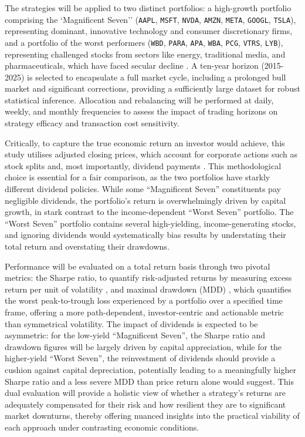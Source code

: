 \documentclass[12pt,a4paper]{report}
\begin{document}
The strategies will be applied to two distinct portfolios: a high-growth portfolio comprising the `Magnificent Seven'' (\texttt{AAPL}, \texttt{MSFT}, \texttt{NVDA}, \texttt{AMZN}, \texttt{META}, \texttt{GOOGL}, \texttt{TSLA}), representing dominant, innovative technology and consumer discretionary firms, and a portfolio of the worst performers (\texttt{WBD}, \texttt{PARA}, \texttt{APA}, \texttt{WBA}, \texttt{PCG}, \texttt{VTRS}, \texttt{LYB}), representing challenged stocks from sectors like energy, traditional media, and pharmaceuticals, which have faced secular decline \citep{YahooFinance2025}. A ten-year horizon (2015-2025) is selected to encapsulate a full market cycle, including a prolonged bull market and significant corrections, providing a sufficiently large dataset for robust statistical inference. Allocation and rebalancing will be performed at daily, weekly, and monthly frequencies to assess the impact of trading horizons on strategy efficacy and transaction cost sensitivity.

Critically, to capture the true economic return an investor would achieve, this study utilises adjusted closing prices, which account for corporate actions such as stock splits and, most importantly, dividend payments \citep{Bodie2023}. This methodological choice is essential for a fair comparison, as the two portfolios have starkly different dividend policies. While some ``Magnificent Seven'' constituents pay negligible dividends, the portfolio's return is overwhelmingly driven by capital growth, in stark contrast to the income-dependent ``Worst Seven'' portfolio. The ``Worst Seven'' portfolio contains several high-yielding, income-generating stocks, and ignoring dividends would systematically bias results by understating their total return and overstating their drawdowns. 

Performance will be evaluated on a total return basis through two pivotal metrics: the Sharpe ratio, to quantify risk-adjusted returns by measuring excess return per unit of volatility \citep{Sharpe1966, Sharpe1994}, and maximal drawdown (MDD) \citep{MagdonIsmail2004}, which quantifies the worst peak-to-trough loss experienced by a portfolio over a specified time frame, offering a more path-dependent, investor-centric and actionable metric than symmetrical volatility. The impact of dividends is expected to be asymmetric: for the low-yield ``Magnificent Seven'', the Sharpe ratio and drawdown figures will be largely driven by capital appreciation, while for the higher-yield ``Worst Seven'', the reinvestment of dividends should provide a cushion against capital depreciation, potentially leading to a meaningfully higher Sharpe ratio and a less severe MDD than price return alone would suggest. This dual evaluation will provide a holistic view of whether a strategy's returns are adequately compensated for their risk and how resilient they are to significant market downturns, thereby offering nuanced insights into the practical viability of each approach under contrasting economic conditions.
\end{document}
